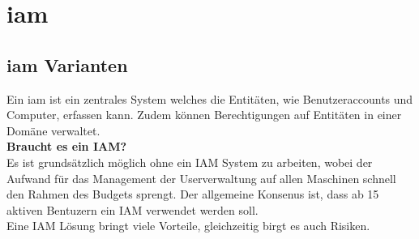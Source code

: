 \chapter{\acrfull{iam}}

\section{\acrshort{iam} Varianten}
Ein \acrfull{iam} ist ein zentrales System welches die Entitäten, wie Benutzeraccounts und Computer, erfassen kann. Zudem können Berechtigungen auf Entitäten in einer Domäne verwaltet.\\

\textbf{Braucht es ein IAM?}\\
Es ist grundsätzlich möglich ohne ein IAM System zu arbeiten, wobei der Aufwand für das Management der Userverwaltung auf allen Maschinen schnell den Rahmen des Budgets sprengt.
Der allgemeine Konsenus ist, dass ab 15 aktiven Bentuzern ein IAM verwendet werden soll.\\

Eine IAM Lösung bringt viele Vorteile, gleichzeitig birgt es auch Risiken.\\


